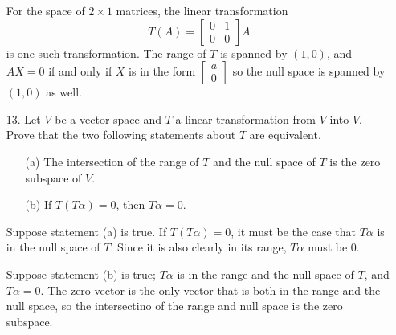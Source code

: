 \documentclass{article}
\begin{document}
\begin{enumerate}[listparindent=\parindent]
    For the space of \(2 \times 1\) matrices, the linear transformation \[T(A) = \begin{bmatrix}0 & 1 \\ 0 & 0\end{bmatrix}A\] is one such transformation.
    The range of \(T\) is spanned by \((1, 0)\), and \(AX = 0\) if and only if \(X\) is in the form \(\begin{bmatrix} a \\ 0 \end{bmatrix}\) so the null space is spanned by \((1, 0)\) as well.

\item[13.] Let \(V\) be a vector space and \(T\) a linear transformation from \(V\) into \(V\). Prove that the two following statements about \(T\) are equivalent.
    \begin{enumerate}
        \item[(a)] The intersection of the range of \(T\) and the null space of \(T\) is the zero subspace of \(V\).
        \item[(b)] If \(T(T\alpha) = 0\), then \(T\alpha = 0\).
    \end{enumerate}

    Suppose statement (a) is true. If \(T(T\alpha) = 0\), it must be the case that \(T\alpha\) is in the null space of \(T\).
    Since it is also clearly in its range, \(T\alpha\) must be 0.

    Suppose statement (b) is true; \(T\alpha\) is in the range and the null space of \(T\), and \(T\alpha = 0\).
    The zero vector is the only vector that is both in the range and the null space, so the intersectino of the range and null space is the zero subspace.
\end{enumerate}
\end{document}
